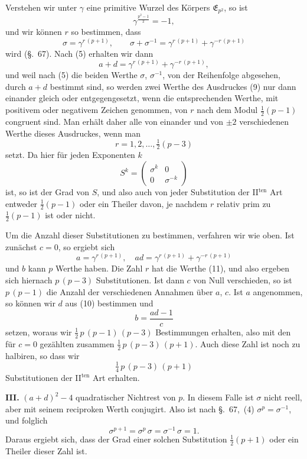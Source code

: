 \documentclass[12pt,a4paper]{article}
\begin{document}
Verstehen wir unter $\gamma$ eine primitive Wurzel des Körpers $\mathfrak{E}_{p^{2}}$, so ist
\[
\gamma^{\frac{p^{2}-1}{2}} = -1,
\]
und wir können $r$ so bestimmen, dass
\begin{equation}\label{eq:68.9}
\tag{9}
\sigma = \gamma^{r\,(p+1)},\qquad
\sigma + \sigma^{-1} = \gamma^{r\,(p+1)} + \gamma^{-r\,(p+1)}
\end{equation}
wird (\S.~67). Nach (5) erhalten wir dann
\begin{equation}\label{eq:68.10}
\tag{10}
a + d = \gamma^{r\,(p+1)} + \gamma^{-r\,(p+1)},
\end{equation}
und weil nach (5) die beiden Werthe $\sigma$, $\sigma^{-1}$, von der Reihenfolge abgesehen, durch $a + d$ bestimmt sind, so werden zwei Werthe des Ausdruckes (9) nur dann einander gleich oder entgegengesetzt, wenn die entsprechenden Werthe, mit positivem oder negativem Zeichen genommen, von $r$ nach dem Modul $\frac{1}{2}(p-1)$ congruent sind. Man erhält daher alle von einander und von $\pm 2$ verschiedenen Werthe dieses Ausdruckes, wenn man
\begin{equation}\label{eq:68.11}
\tag{11}
r = 1, 2, \ldots, \tfrac{1}{2}(p-3)
\end{equation}
setzt. Da hier für jeden Exponenten $k$
\[
S^{k} = \begin{pmatrix}\sigma^{k}&0\\0&\sigma^{-k}\end{pmatrix}
\]
ist, so ist der Grad von $S$, und also auch von jeder Substitution der II$^{\text{ten}}$ Art entweder $\frac{1}{2}(p-1)$ oder ein Theiler davon, je nachdem $r$ relativ prim zu $\frac{1}{2}(p-1)$ ist oder nicht.

Um die Anzahl dieser Substitutionen zu bestimmen, verfahren wir wie oben. Ist zunächst $c = 0$, so ergiebt sich
\[
a = \gamma^{r\,(p+1)},\quad ad = \gamma^{r\,(p+1)} + \gamma^{-r\,(p+1)}
\]
und $b$ kann $p$ Werthe haben. Die Zahl $r$ hat die Werthe (11), und also ergeben sich hiernach $p\,(p-3)$ Substitutionen. Ist dann $c$ von Null verschieden, so ist $p\,(p-1)$ die Anzahl der verschiedenen Annahmen über $a$, $c$. Ist $a$ angenommen, so können wir $d$ aus (10) bestimmen und
\[
b = \frac{ad-1}{c}
\]
setzen, woraus wir $\frac{1}{2}\,p\,(p-1)\,(p-3)$ Bestimmungen erhalten, also mit den für $c = 0$ gezählten zusammen $\frac{1}{2}\,p\,(p-3)\,(p+1)$. Auch diese Zahl ist noch zu halbiren, so dass wir
\[
\tfrac{1}{4}\,p\,(p-3)\,(p+1)
\]
Substitutionen der II$^{\text{ten}}$ Art erhalten.

\medskip\noindent
\textbf{III.} $(a + d)^{2} - 4$ quadratischer Nichtrest von $p$. In diesem Falle ist $\sigma$ nicht reell, aber mit seinem reciproken Werth conjugirt. Also ist nach \S.~67,~(4) $\sigma^{p} = \sigma^{-1}$, und folglich
\[
\sigma^{p+1} = \sigma^{p}\,\sigma = \sigma^{-1}\,\sigma = 1.
\]
Daraus ergiebt sich, dass der Grad einer solchen Substitution $\frac{1}{2}(p+1)$ oder ein Theiler dieser Zahl ist.
\end{document}
